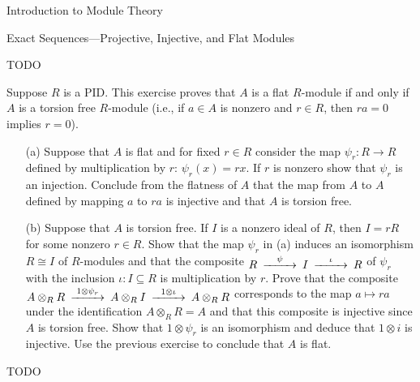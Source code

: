 \begin{chapter}{Introduction to Module Theory}
\begin{section}{Exact Sequences---Projective, Injective, and Flat Modules}
\begin{problem}
\begin{enumerate}
\end{enumerate}
\end{problem}
\begin{solution}TODO

\end{solution}\oneperpage



\begin{problem}\label{ex:10.5.26}
Suppose $R$ is a PID. This exercise proves that $A$ is a flat $R$-module if and only if $A$ is a torsion free $R$-module (i.e., if $a\in A$ is nonzero and $r\in R$, then $ra=0$ implies $r=0$). \begin{enumerate}
\item[(a)] Suppose that $A$ is flat and for fixed $r\in R$ consider the map $\psi_r:R\to R$ defined by multiplication by $r$: $\psi_r(x)=rx$. If $r$ is nonzero show that $\psi_r$ is an injection. Conclude from the flatness of $A$ that the map from $A$ to $A$ defined by mapping $a$ to $ra$ is injective and that $A$ is torsion free.
\item[(b)] Suppose that $A$ is torsion free. If $I$ is a nonzero ideal of $R$, then $I = rR$ for some nonzero $r\in R$. Show that the map $\psi_r$ in (a) induces an isomorphism $R\cong I$ of $R$-modules and that the composite $\begin{CD}R@>\psi>>I@>\iota>>R\end{CD}$ of $\psi_r$ with the inclusion $\iota:I\subseteq R$ is multiplication by $r$. Prove that the composite $\begin{CD} A\otimes_R R@>1\otimes\psi_r>>A\otimes_RI@>1\otimes\iota>>A\otimes_RR\end{CD}$ corresponds to the map $a\mapsto ra$ under the identification $A\otimes_RR = A$ and that this composite is injective since $A$ is torsion free. Show that $1\otimes \psi_r$ is an isomorphism and deduce that $1\otimes i$ is injective. Use the previous exercise to conclude that $A$ is flat.
\end{enumerate}
\end{problem}
\begin{solution}TODO

\end{solution}\oneperpage




\end{section}
\end{chapter}

